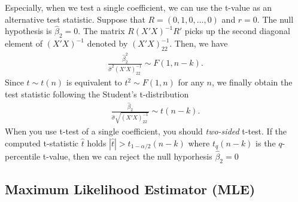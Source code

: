 \documentclass[
  12pt,
]{article}
\begin{document}
Especially, when we test a single coefficient, we can use the t-value as an alternative test statistic.
Suppose that \(R = (0, 1, 0, \ldots, 0)\) and \(r = 0\).
The null hypothesis is \(\hat{\beta}_2 = 0\).
The matrix \(R (X'X)^{-1} R'\) picks up the second diagonal element of \((X'X)^{-1}\) denoted by \((X'X)^{-1}_{22}\).
Then, we have
\begin{align*}
  \frac{\hat{\beta}_2^2}{\hat{\sigma}^2 (X'X)^{-1}_{22}} \sim F(1, n-k).
\end{align*}
Since \(t \sim t(n)\) is equivalent to \(t^2 \sim F(1, n)\) for any \(n\),
we finally obtain the test statistic following the Student's t-distribution
\begin{align*}
  \frac{\hat{\beta}_2}{\hat{\sigma} \sqrt{(X'X)^{-1}_{22}}} \sim t(n - k).
\end{align*}
When you use t-test of a single coefficient, you should \emph{two-sided} t-test.
If the computed t-statistic \(\hat{t}\) holds \(|\hat{t}| > t_{1-\alpha/2}(n-k)\)
where \(t_{q}(n-k)\) is the \(q\)-percentile t-value,
then we can reject the null hyporhesis \(\hat{\beta}_2 = 0\)

\hypertarget{maximum-likelihood-estimator-mle}{%
\subsection{Maximum Likelihood Estimator (MLE)}\label{maximum-likelihood-estimator-mle}}
\end{document}

